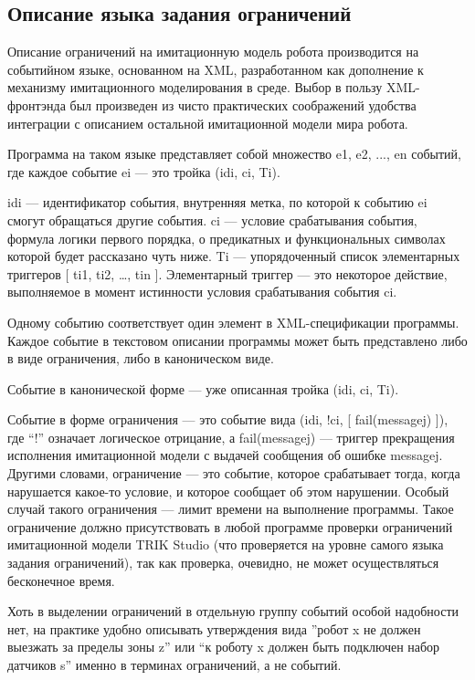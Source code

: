 \documentclass[conference]{IEEEtran}
\begin{document}
\subsection{Описание языка задания ограничений}
Описание ограничений на имитационную модель робота производится на событийном языке, 
основанном на XML, разработанном как дополнение к механизму имитационного моделирования 
в среде. Выбор в пользу XML-фронтэнда был произведен из чисто практических соображений 
удобства интеграции с описанием остальной имитационной модели мира робота.

Программа на таком языке представляет собой множество { e1, e2, ..., en } событий, где 
каждое событие ei --- это тройка (idi, ci, Ti).

idi --- идентификатор события, внутренняя метка, по которой к событию ei смогут обращаться другие события.
ci --- условие срабатывания события, формула логики первого порядка, о предикатных и функциональных символах которой будет рассказано чуть ниже.
Ti --- упорядоченный список элементарных триггеров [ ti1, ti2, …, tin ]. Элементарный триггер --- это некоторое действие, выполняемое в момент истинности условия срабатывания события ci.

Одному событию соответствует один элемент в XML-спецификации программы. Каждое событие 
в текстовом описании программы может быть представлено либо в виде ограничения, либо в каноническом виде.

Событие в канонической форме --- уже описанная тройка (idi, ci, Ti).

Событие в форме ограничения --- это событие вида (idi, !ci, [ fail(messagej) ]), где “!” означает логическое отрицание, а fail(messagej) --- триггер прекращения исполнения имитационной модели с выдачей сообщения об ошибке messagej. Другими словами, ограничение --- это событие, которое срабатывает тогда, когда нарушается какое-то условие, и которое сообщает об этом нарушении. Особый случай такого ограничения --- лимит времени на выполнение программы. Такое ограничение должно присутствовать в любой программе проверки ограничений имитационной модели TRIK Studio (что проверяется на уровне самого языка задания ограничений), так как проверка, очевидно, не может осуществляться бесконечное время. 

Хоть в выделении ограничений в отдельную группу событий особой надобности нет, на практике удобно описывать утверждения вида ”робот x не должен выезжать за пределы зоны z” или “к роботу x должен быть подключен набор датчиков s” именно в терминах ограничений, а не событий.
\end{document}
